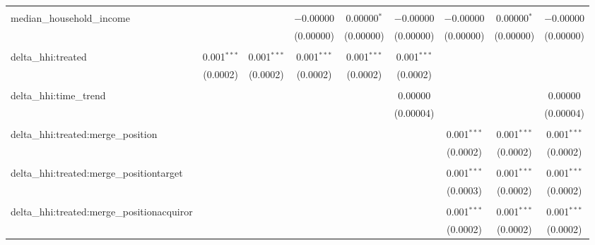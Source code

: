 \begin{table}[H]
{\begin{tabular}{@{\extracolsep{5pt}}lcccccccc}
   & & & & & & & & \\  

  median\_household\_income &  &  & $-$0.00000 & 0.00000$^{*}$ & $-$0.00000 & $-$0.00000 & 0.00000$^{*}$ & $-$0.00000 \\  

   &  &  & (0.00000) & (0.00000) & (0.00000) & (0.00000) & (0.00000) & (0.00000) \\  

   & & & & & & & & \\  

  delta\_hhi:treated & 0.001$^{***}$ & 0.001$^{***}$ & 0.001$^{***}$ & 0.001$^{***}$ & 0.001$^{***}$ &  &  &  \\  

   & (0.0002) & (0.0002) & (0.0002) & (0.0002) & (0.0002) &  &  &  \\  

   & & & & & & & & \\  

  delta\_hhi:time\_trend &  &  &  &  & 0.00000 &  &  & 0.00000 \\  

   &  &  &  &  & (0.00004) &  &  & (0.00004) \\  

   & & & & & & & & \\  

  delta\_hhi:treated:merge\_position &  &  &  &  &  & 0.001$^{***}$ & 0.001$^{***}$ & 0.001$^{***}$ \\  

   &  &  &  &  &  & (0.0002) & (0.0002) & (0.0002) \\  

   & & & & & & & & \\  

  delta\_hhi:treated:merge\_positiontarget &  &  &  &  &  & 0.001$^{***}$ & 0.001$^{***}$ & 0.001$^{***}$ \\  

   &  &  &  &  &  & (0.0003) & (0.0002) & (0.0002) \\  

   & & & & & & & & \\  

  delta\_hhi:treated:merge\_positionacquiror &  &  &  &  &  & 0.001$^{***}$ & 0.001$^{***}$ & 0.001$^{***}$ \\  

   &  &  &  &  &  & (0.0002) & (0.0002) & (0.0002) \\  


\end{tabular}}
\end{table}
